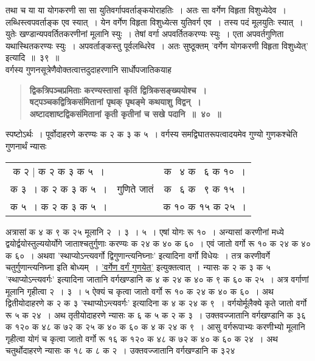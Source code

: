 \documentclass[11pt, openany]{book}
\begin{document}
\newpage

\begin{sloppypar}
\noindent तथा च या या योगकरणी सा सा युतिवर्गापवर्ताङ्कयोराहतिः~। अतः सा वर्गेण विहृता विशुध्येदेव~। लब्धिस्त्वपवर्ताङ्क एव स्यात्~। येन वर्गेण विहृता विशुध्येत्स युतिवर्ग एव~। तस्य पदं मूलयुतिः स्यात्~। युतेः खण्डान्यपवर्तितकरणीनां मूलानि स्युः~। तेषां वर्गा अपवर्तितकरण्यः स्युः~। एता अपवर्तगुणिता यथास्थितकरण्यः स्युः~। अपवर्ताङ्कस्तु पूर्वलब्धिरेव~। अतः सुष्ठूक्तम् {\color{violet}'वर्गेण योगकरणी विहृता विशुध्येत्'} इत्यादि~॥~३९~॥\\

{\small वर्गस्य गुणनसूत्रेणैवोक्तत्वात्तदुदाहरणानि सार्धोपजातिकयाह\textendash }

 \label{4.40}
\begin{quote}
{\large \textbf{{\color{purple}द्विकत्रिपञ्चप्रमिताः करण्यस्तासां कृतिं द्वित्रिकसङ्ख्ययोश्च~।\\
षट्पञ्चकद्वित्रिकसंमितानां पृथक् पृथङ्मे कथयाशु विद्वन्~।\\
अष्टादशाष्टद्विकसंमितानां कृती कृतीनां च सखे पदानि~॥~४०~॥}}}
\end{quote}

स्पष्टोऽर्थः~। पूर्वोदाहरणे करण्यः क २ क ३ क ५~। वर्गस्य समद्विघातरूपत्वादयमेव गुण्यो गुणकश्चेति गुणनार्थं न्यासः
\vspace{-2mm}

\begin{center}
\begin{tabular}{ccc}
{क २ | क २ क ३ क ५~।} & {} & {क \;~४ क \;~६ क १०~।}\\
{क ३~। क २ क ३ क ५~।} & {गुणिते जातं} & {क \;~६ क \;~९ क १५~।}\\
{क ५~। क २ क ३ क ५~।} & {} & {क १० क १५ क २५~।}
\end{tabular}
\end{center}
\vspace{-2mm}

\noindent अत्रासां क ४ क ९ क २५ मूलानि २~। ३~। ५~। एषां योगः रू १०~। अन्यासां करणीनां मध्ये द्वयोर्द्वयोस्तुल्ययोर्योगे जाताश्चतुर्गुणाः करण्यः क २४ क ४० क ६०~। एवं जातो वर्गो रू १० क २४ क ४० क ६०~। अथवा {\color{violet}'स्थाप्योऽन्त्यवर्गो द्विगुणान्त्यनिघ्नाः'} इत्यादिना वर्गो विधेयः~। तत्र करणीवर्गे चतुर्गुणान्त्यनिघ्ना इति बोध्यम्~। \hyperref[4.34]{'वर्गेण वर्गं गुणयेत्'} इत्युक्तत्वात्~। न्यासः क २ क ३ क ५ {\color{violet}'स्थाप्योऽन्त्यवर्गः'} इत्यादिना जातानि वर्गखण्डानि क ४ क २४ क ४० क ९ क ६० क २५~। अत्र वर्गाणां मूलानि गृहीत्वा २~। ३~। ५ ऐक्यं च कृत्वा जातो वर्गो रू १० क २४ क ४० क ६०~। अथ द्वितीयोदाहरणे क २ क ३ {\color{violet}'स्थाप्योऽन्त्यवर्गः'} इत्यादिना क ४ क २४ क ९~। वर्गयोर्मूलैक्ये कृते जातो वर्गो रू ५ क २४~। अथ तृतीयोदाहरणे न्यासः क ६ क ५ क २ क ३~। उक्तवज्जातानि वर्गखण्डानि क ३६ क १२० क ४८ क ७२ क २५ क ४० क ६० क ४ क २४ क ९~। आसु वर्गरूपाभ्यः करणीभ्यो मूलानि गृहीत्वा योगं च कृत्वा जातो वर्गो रू १६ क १२० क ४८ क ७२ क ४० क ६० क २४~। अथ चतुर्थोदाहरणे न्यासः क १८ क ८ क २~। उक्तवज्जातानि वर्गखण्डानि क ३२४
\end{sloppypar}
\end{document}
